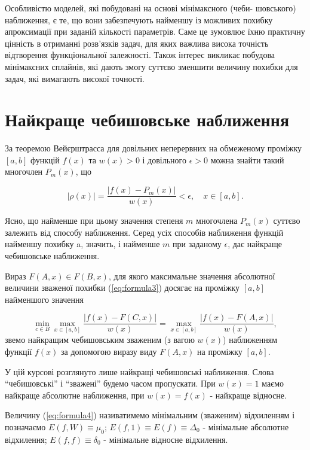 \documentclass[ukrainian,14pt]{extarticle}
\begin{document}
Особливістю моделей, які побудовані на основі мінімаксного (чеби-
шовського) наближення, є те, що вони забезпечують найменшу із можливих
похибку апроксимації при заданій кількості параметрів. Саме це зумовлює їхню
практичну цінність в отриманні розв’язків задач, для яких важлива висока
точність відтворення функціональної залежності. Також інтерес викликає побудова
мінімаксних сплайнів, які дають змогу суттєво зменшити величину похибки для задач,
які вимагають високої точності.
\newpage

\section{Найкраще чебишовське наближення}

За теоремою Вейєрштрасса для довільних неперервних на обмеженому проміжку $[a,b]$   
функцій $f(x)$ та $w(x) > 0$ і довільного $\epsilon > 0$ можна знайти такий многочлен $P_m(x)$, що

$$|\rho(x)| = \frac{|f(x) - P_m(x)|}{w(x)} < \epsilon, \quad x \in [a,b].$$

Ясно, що найменше при цьому значення степеня $m$ многочлена $P_m(x)$ суттєво залежить від способу наближення. Серед усіх способів наближення функцій найменшу похибку a, значить, і найменше $m$ при заданому $\epsilon$, дає найкраще чебишовське наближення.

Вираз $F(A,x) \in F(B,x)$, для якого максимальне значення абсолютної величини зваженої похибки (\ref{eq:formula3}) досягає на проміжку $[a,b]$ найменшого значення

\begin{equation}\label{eq:formula4}
\min_{c \in B} \max_{x \in [a,b]} \frac{|f(x) - F(C,x)|}{w(x)} = \max_{x \in [a,b]} \frac{|f(x) - F(A,x)|}{w(x)},
\end{equation}
звемо найкращим чебишовським зваженим (з вагою $w(x)$) наближенням функції $f(x)$ за допомогою виразу виду $F(A,x)$ на проміжку $[a,b]$.

У цій курсові розглянуто лише найкращі чебишовські наближення. Слова ``чебишовські'' і ``зважені'' будемо часом пропускати. При $w(x) = 1$ маємо найкраще абсолютне наближення, при $w(x) = f(x)$ - найкраще відносне.

Величину (\ref{eq:formula4}) називатимемо мінімальним (зваженим) відхиленням і позначаємо $E(f,W)\equiv\mu_0$; $E(f,1) \equiv E(f) \equiv \Delta_0$ - мінімальне абсолютне відхилення; $E(f,f) \equiv \delta_0$ - мінімальне відносне відхилення.
\end{document}
